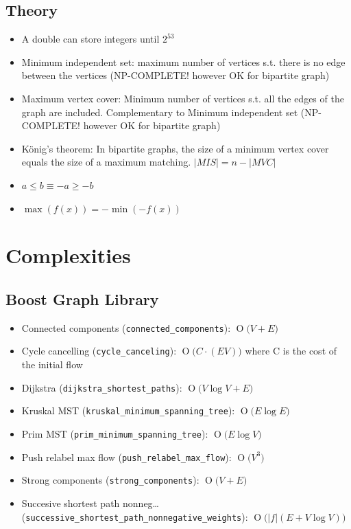 \documentclass[10pt,a4paper,landscape,twocolumn,twoside]{article}
\newcommand{\BigO}[1]{\ensuremath{\operatorname{O}\bigl(#1\bigr)}}
\begin{document}
	\subsection{Theory}
	\label{sub:Theory}
		\begin{itemize}
			\item A double can store integers until $2^{53}$
			\item Minimum independent set: maximum number of vertices s.t. there is no edge between the vertices (NP-COMPLETE! however OK for bipartite graph)
			\item Maximum vertex cover: Minimum number of vertices s.t. all the edges of the graph are included. Complementary to Minimum independent set (NP-COMPLETE! however OK for bipartite graph)
			\item König's theorem: In bipartite graphs, the size of a minimum vertex cover equals the size of a maximum matching. $|MIS| = n - |MVC|$
			\item $a \leq b \equiv -a \geq -b$
			\item $\max(f(x)) = -\min(-f(x))$
		\end{itemize}

\section{Complexities}
	\subsection{Boost Graph Library}
		\begin{itemize}
			\item Connected components (\texttt{connected\_components}): $ \BigO{V + E} $
			\item Cycle cancelling (\texttt{cycle\_canceling}): $ \BigO{C \cdot (EV)} $ where C is the cost of the initial flow
			\item Dijkstra (\texttt{dijkstra\_shortest\_paths}): $ \BigO{V \log V + E} $
			\item Kruskal MST (\texttt{kruskal\_minimum\_spanning\_tree}): $ \BigO{E \log E} $
			\item Prim MST (\texttt{prim\_minimum\_spanning\_tree}): $ \BigO{E \log V} $
			\item Push relabel max flow (\texttt{push\_relabel\_max\_flow}): $ \BigO{V^{3}} $
			\item Strong components (\texttt{strong\_components}): $ \BigO{V + E} $
			\item Succesive shortest path nonneg\ldots (\texttt{successive\_shortest\_path\_nonnegative\_weights}): $ \BigO{|f|(E + V \log V)} $
		\end{itemize}
\end{document}
